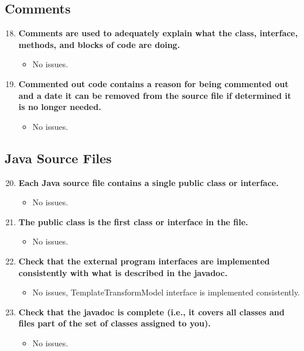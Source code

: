 \documentclass{article}
\begin{document}
		\subsection{Comments}
			\begin{enumerate}
				\setcounter{enumi}{17}
				\item \textbf{Comments are used to adequately explain what the class, interface, methods, and blocks of code are doing.}
				\begin{itemize}
					\item No issues.
				\end{itemize}
				\item \textbf{Commented out code contains a reason for being commented out and a date it can be removed from the source file if determined it is no	longer needed.}
				\begin{itemize}
					\item No issues.
				\end{itemize}
			\end{enumerate}
		\subsection{Java Source Files}
			\begin{enumerate}
				\setcounter{enumi}{19}
				\item \textbf{Each Java source file contains a single public class or interface.}
				\begin{itemize}
					\item No issues.
				\end{itemize}
				\item \textbf{The public class is the first class or interface in the file.}
				\begin{itemize}
					\item No issues.
				\end{itemize}
				\item \textbf{Check that the external program interfaces are implemented consistently with what is described in the javadoc.}
				\begin{itemize}
					\item No issues, TemplateTransformModel interface is implemented consistently.
				\end{itemize}
				\item \textbf{Check that the javadoc is complete (i.e., it covers all classes and files part of the set of classes assigned to you).}
				\begin{itemize}
					\item No issues.
				\end{itemize}
			\end{enumerate}
\end{document}
